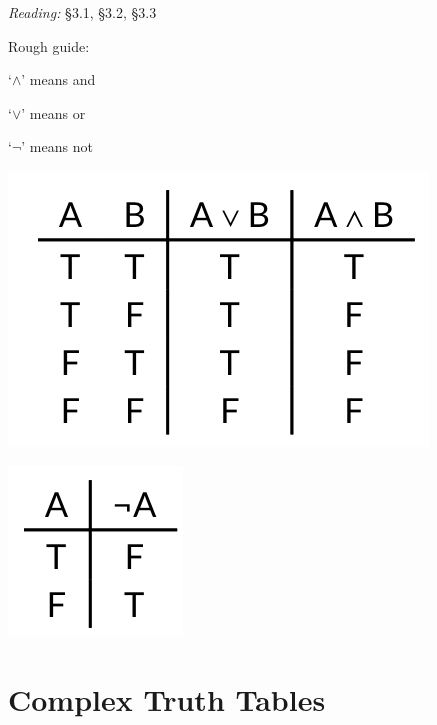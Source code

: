 \documentclass[12pt]{extarticle}
\begin{document}
\begin{multicols*}{3}
\emph{Reading:} §3.1, §3.2, §3.3
 
Rough guide:
 
`$\land{}$' means and
 
`$\lor{}$' means or
 
`$\lnot{}$' means not
 
\begin{center}
\includegraphics[scale=0.3]{img/truth_table_or_and.png}
\end{center}
\begin{center}
\includegraphics[scale=0.3]{img/truth_table_not.png}
\end{center}
 
 
\section{Complex Truth Tables}
 

\end{multicols*}
\end{document}
